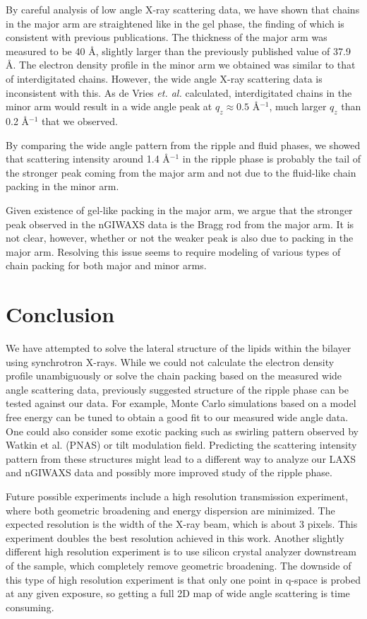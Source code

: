 By careful analysis of low angle X-ray scattering data, we have shown that
chains in the major arm are straightened like in the gel phase, the finding
of which is consistent with previous publications. The thickness of the major
arm was measured to be 40 \AA, slightly larger than the previously published 
value of 37.9 \AA \cite{ref:Sun96}. 
The electron density
profile in the minor arm we obtained was similar to that of interdigitated 
chains. However, the wide angle X-ray scattering data is inconsistent with
this. As de Vries \textit{et. al.} calculated, interdigitated chains in
the minor arm would result in a wide angle peak at $q_z \approx 0.5$ \AA$^{-1}$,
much larger $q_z$ than 0.2 \AA$^{-1}$ that we observed.

By comparing the wide angle pattern from the ripple and fluid phases,
we showed that scattering intensity around 1.4 \AA$^{-1}$ in the ripple phase
is probably the tail of the stronger peak coming from the major arm 
and not due to the fluid-like chain packing in the minor arm.
 
Given existence of gel-like packing in the major arm, we argue that the 
stronger peak observed in the nGIWAXS data is the Bragg rod from the 
major arm. It is not clear, however, whether or not the weaker peak is 
also due to packing in the major arm. Resolving this issue seems to require
modeling of various types of chain packing for both major and minor arms.
 
\section{Conclusion}
We have attempted to solve the lateral structure of the lipids within the
bilayer using synchrotron X-rays. 
While we could not calculate the electron density profile unambiguously
or solve the chain packing based on the measured wide angle scattering data, 
previously suggested structure of the ripple phase can be tested against
our data.
For example, Monte Carlo simulations based on a model free energy can be tuned
to obtain a good fit to our measured wide angle data.
One could also consider some exotic packing such as swirling pattern observed
by Watkin et al. (PNAS) or tilt modulation field. Predicting the scattering
intensity pattern from these structures might lead to a different way
to analyze our LAXS and nGIWAXS data and possibly more improved study of the 
ripple phase. 

Future possible experiments
include a high resolution transmission experiment, where both geometric 
broadening and energy dispersion are minimized. The expected resolution 
is the width of the X-ray beam, which is about 3 pixels. This experiment 
doubles the best resolution achieved in this work. 
Another slightly different high resolution experiment is to use silicon 
crystal analyzer downstream of the sample, which completely remove geometric
broadening. The downside of this type of high resolution experiment is that
only one point in q-space is probed at any given exposure, so getting a full
2D map of wide angle scattering is time consuming.  

